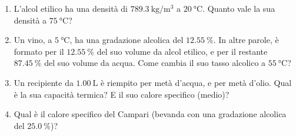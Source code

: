 \begin{enumerate}
    \item L'alcol etilico ha una densità di $\SI{789.3}{\kilogram/\meter^{3}}$ a $\SI{20}{\celsius}$. Quanto vale la sua densità a $\SI{75}{\celsius}$? 
    
    \item Un vino, a $\SI{5}{\celsius}$, ha una gradazione alcolica del $\SI{12,55}{\percent}$. In altre parole, è formato per il $\SI{12,55}{\percent}$ del suo volume da alcol etilico, e per il restante $\SI{87,45}{\percent}$ del suo volume da acqua. Come cambia il suo tasso alcolico a $\SI{55}{\celsius}$?
    
    \item Un recipiente da $\SI{1,00}{\liter}$ è riempito per metà d'acqua, e per metà d'olio. Qual è la sua capacità termica? E il suo calore specifico (medio)?

    \item Qual è il calore specifico del Campari (bevanda con una gradazione alcolica del $\SI{25,0}{\percent}$)?
\end{enumerate}

